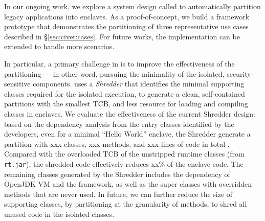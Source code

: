 In our ongoing work,
we explore a system design called \term{\civet{}} to automatically partition legacy \java{} applications into \sgx{} enclaves.
As a proof-of-concept,
we build a framework prototype that demonstrates the partitioning of
three representative use cases described in \S\ref{sec:civet:cases}.
For future works,
the implementation can be extended to handle more scenarios.


In particular, a primary challenge in \civet{} is
to improve the effectiveness of the partitioning
--- in other word, pursuing the minimality of the isolated, security-sensitive components.
\civet{} uses a \emph{Shredder} that identifies the minimal supporting classes required
for the isolated execution,
to generate a clean, self-contained partitions
with the smallest TCB, and less resource for loading and compiling classes in enclaves.
We evaluate the effectiveness of the current Shredder design:
based on the dependency analysis from the entry classes identified by the developers,
even for a minimal ``Hello World'' enclave,
the Shredder generate a partition with
xxx classes, xxx methods,
and xxx lines of code in total .
Compared with the overloaded TCB of the unstripped \java{} runtime classes
(from {\tt rt.jar}),
the shredded code effectively reduces xx\% of the enclave code.
The remaining classes generated by the Shredder
includes the dependency of OpenJDK \java{} VM and the \civet{} framework,
as well as the super classes
with overridden methods that are never used.
In future, we can further reduce the size of supporting classes,
by partitioning 
at the granularity of methods,
to shred all unused code in the isolated classes.


